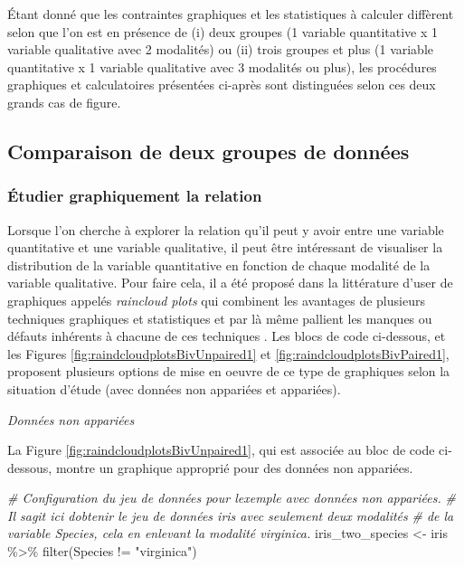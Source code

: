 \documentclass[
]{book}
\newenvironment{Shaded}{\begin{snugshade}}{\end{snugshade}}
\newcommand{\CommentTok}[1]{\textcolor[rgb]{0.56,0.35,0.01}{\textit{#1}}}
\newcommand{\FunctionTok}[1]{\textcolor[rgb]{0.00,0.00,0.00}{#1}}
\newcommand{\NormalTok}[1]{#1}
\newcommand{\OtherTok}[1]{\textcolor[rgb]{0.56,0.35,0.01}{#1}}
\newcommand{\SpecialCharTok}[1]{\textcolor[rgb]{0.00,0.00,0.00}{#1}}
\newcommand{\StringTok}[1]{\textcolor[rgb]{0.31,0.60,0.02}{#1}}
\begin{document}
Étant donné que les contraintes graphiques et les statistiques à calculer diffèrent selon que l'on est en présence de (i) deux groupes (1 variable quantitative x 1 variable qualitative avec 2 modalités) ou (ii) trois groupes et plus (1 variable quantitative x 1 variable qualitative avec 3 modalités ou plus), les procédures graphiques et calculatoires présentées ci-après sont distinguées selon ces deux grands cas de figure.

\hypertarget{comparaison-de-deux-groupes-de-donnuxe9es}{%
\subsection{Comparaison de deux groupes de données}\label{comparaison-de-deux-groupes-de-donnuxe9es}}

\hypertarget{uxe9tudier-graphiquement-la-relation-2}{%
\subsubsection{Étudier graphiquement la relation}\label{uxe9tudier-graphiquement-la-relation-2}}

Lorsque l'on cherche à explorer la relation qu'il peut y avoir entre une variable quantitative et une variable qualitative, il peut être intéressant de visualiser la distribution de la variable quantitative en fonction de chaque modalité de la variable qualitative. Pour faire cela, il a été proposé dans la littérature d'user de graphiques appelés \emph{raincloud plots} qui combinent les avantages de plusieurs techniques graphiques et statistiques et par là même pallient les manques ou défauts inhérents à chacune de ces techniques \autocite{allenRaincloudPlotsMultiplatform2019}. Les blocs de code ci-dessous, et les Figures \ref{fig:raindcloudplotsBivUnpaired1} et \ref{fig:raindcloudplotsBivPaired1}, proposent plusieurs options de mise en oeuvre de ce type de graphiques selon la situation d'étude (avec données non appariées et appariées).

\emph{Données non appariées}

La Figure \ref{fig:raindcloudplotsBivUnpaired1}, qui est associée au bloc de code ci-dessous, montre un graphique approprié pour des données non appariées.

\begin{Shaded}
\begin{Highlighting}[]
\CommentTok{\# Configuration du jeu de données pour l\textquotesingle{}exemple avec données non appariées.}
\CommentTok{\# Il s\textquotesingle{}agit ici d\textquotesingle{}obtenir le jeu de données \textasciigrave{}iris\textasciigrave{} avec seulement deux modalités  }
\CommentTok{\# de la variable \textasciigrave{}Species\textasciigrave{}, cela en enlevant la modalité \textasciigrave{}virginica\textasciigrave{}.}
\NormalTok{iris\_two\_species }\OtherTok{\textless{}{-}}
\NormalTok{  iris }\SpecialCharTok{\%\textgreater{}\%} \FunctionTok{filter}\NormalTok{(Species }\SpecialCharTok{!=} \StringTok{"virginica"}\NormalTok{)}
\end{Highlighting}
\end{Shaded}
\end{document}
